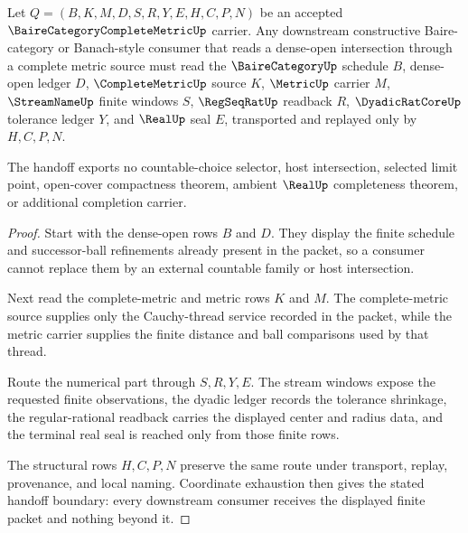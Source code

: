 \begin{theorem}
\label{thm:baire-category-complete-metric-dense-open-handoff}
Let $Q=(B,K,M,D,S,R,Y,E,H,C,P,N)$ be an accepted $\BaireCategoryCompleteMetricUp$ carrier. Any downstream constructive Baire-category or Banach-style consumer that reads a dense-open intersection through a complete metric source must read the $\BaireCategoryUp$ schedule $B$, dense-open ledger $D$, $\CompleteMetricUp$ source $K$, $\MetricUp$ carrier $M$, $\StreamNameUp$ finite windows $S$, $\RegSeqRatUp$ readback $R$, $\DyadicRatCoreUp$ tolerance ledger $Y$, and $\RealUp$ seal $E$, transported and replayed only by $H,C,P,N$.

The handoff exports no countable-choice selector, host intersection, selected limit point, open-cover compactness theorem, ambient $\RealUp$ completeness theorem, or additional completion carrier.
\end{theorem}
\begin{proof}
Start with the dense-open rows $B$ and $D$. They display the finite schedule and successor-ball refinements already present in the packet, so a consumer cannot replace them by an external countable family or host intersection.

Next read the complete-metric and metric rows $K$ and $M$. The complete-metric source supplies only the Cauchy-thread service recorded in the packet, while the metric carrier supplies the finite distance and ball comparisons used by that thread.

Route the numerical part through $S,R,Y,E$. The stream windows expose the requested finite observations, the dyadic ledger records the tolerance shrinkage, the regular-rational readback carries the displayed center and radius data, and the terminal real seal is reached only from those finite rows.

The structural rows $H,C,P,N$ preserve the same route under transport, replay, provenance, and local naming. Coordinate exhaustion then gives the stated handoff boundary: every downstream consumer receives the displayed finite packet and nothing beyond it.
\end{proof}


